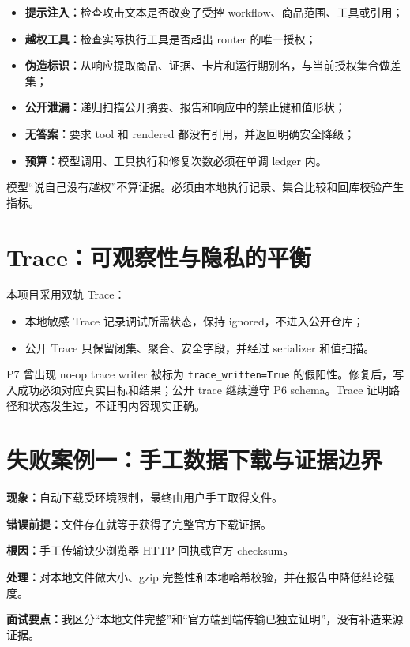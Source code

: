 \begin{itemize}
  \item \textbf{提示注入：}检查攻击文本是否改变了受控 workflow、商品范围、工具或引用；
  \item \textbf{越权工具：}检查实际执行工具是否超出 router 的唯一授权；
  \item \textbf{伪造标识：}从响应提取商品、证据、卡片和运行期别名，与当前授权集合做差集；
  \item \textbf{公开泄漏：}递归扫描公开摘要、报告和响应中的禁止键和值形状；
  \item \textbf{无答案：}要求 tool 和 rendered 都没有引用，并返回明确安全降级；
  \item \textbf{预算：}模型调用、工具执行和修复次数必须在单调 ledger 内。
\end{itemize}

模型“说自己没有越权”不算证据。必须由本地执行记录、集合比较和回库校验产生指标。

\section{Trace：可观察性与隐私的平衡}

本项目采用双轨 Trace：

\begin{itemize}
  \item 本地敏感 Trace 记录调试所需状态，保持 ignored，不进入公开仓库；
  \item 公开 Trace 只保留闭集、聚合、安全字段，并经过 serializer 和值扫描。
\end{itemize}

P7 曾出现 no-op trace writer 被标为 \texttt{trace\_written=True} 的假阳性。修复后，写入成功必须对应真实目标和结果；公开 trace 继续遵守 P6 schema。Trace 证明路径和状态发生过，不证明内容现实正确。

\section{失败案例一：手工数据下载与证据边界}

\textbf{现象：}自动下载受环境限制，最终由用户手工取得文件。\par
\textbf{错误前提：}文件存在就等于获得了完整官方下载证据。\par
\textbf{根因：}手工传输缺少浏览器 HTTP 回执或官方 checksum。\par
\textbf{处理：}对本地文件做大小、gzip 完整性和本地哈希校验，并在报告中降低结论强度。\par
\textbf{面试要点：}我区分“本地文件完整”和“官方端到端传输已独立证明”，没有补造来源证据。

